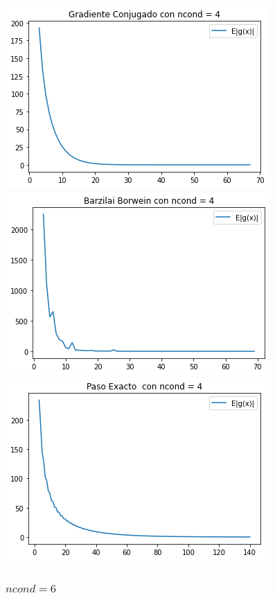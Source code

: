 \documentclass[11pt,letterpaper]{article}
\theoremstyle{definition}
\theoremstyle{definition}
\theoremstyle{definition}
\begin{document}
\begin{center}
	\includegraphics[width=0.7\linewidth]{graficas/gc_4}
	\includegraphics[width=0.7\linewidth]{graficas/bb_4}
	\includegraphics[width=0.7\linewidth]{graficas/sd_4}
\end{center}
\subsubsection{$ ncond = 6 $}
\end{document}
